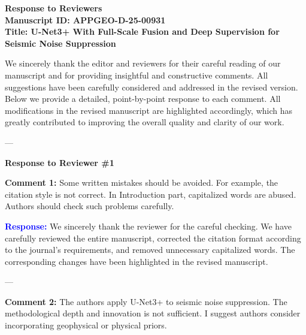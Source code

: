 \documentclass[12pt]{article}
\begin{document}
\begin{center}
    \textbf{\Large Response to Reviewers} \\[1em]
    \textbf{Manuscript ID: APPGEO-D-25-00931} \\
    \textbf{Title: U-Net3+ With Full-Scale Fusion and Deep Supervision for Seismic Noise Suppression} \\[1em]
\end{center}

We sincerely thank the editor and reviewers for their careful reading of our manuscript and for providing insightful and constructive comments. 
All suggestions have been carefully considered and addressed in the revised version. 
Below we provide a detailed, point-by-point response to each comment. 
All modifications in the revised manuscript are highlighted accordingly, which has greatly contributed to improving the overall quality and clarity of our work.

---

\textbf{Response to Reviewer \#1}

\textbf{Comment 1:}  
Some written mistakes should be avoided. For example, the citation style is not correct. In Introduction part, capitalized words are abused. Authors should check such problems carefully.

\textcolor{blue}{\textbf{Response:}}  
We sincerely thank the reviewer for the careful checking. We have carefully reviewed the entire manuscript, corrected the citation format according to the journal’s requirements, and removed unnecessary capitalized words. The corresponding changes have been highlighted in the revised manuscript.

---

\textbf{Comment 2:}  
The authors apply U-Net3+ to seismic noise suppression. The methodological depth and innovation is not sufficient. I suggest authors consider incorporating geophysical or physical priors.
\end{document}
